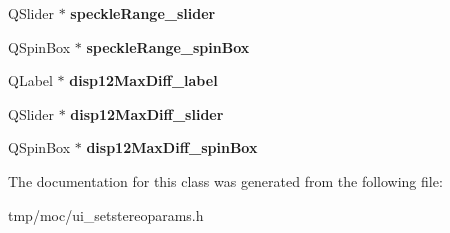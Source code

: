 \begin{DoxyCompactItemize}
\item 
Q\+Slider $\ast$ {\bfseries speckle\+Range\+\_\+slider}\hypertarget{class_ui___set_stereo_params_a61638a0d0a65f4e4a39b958e9452ee7d}{}\label{class_ui___set_stereo_params_a61638a0d0a65f4e4a39b958e9452ee7d}

\item 
Q\+Spin\+Box $\ast$ {\bfseries speckle\+Range\+\_\+spin\+Box}\hypertarget{class_ui___set_stereo_params_a7c4da87db1e119212bf3fd90b88d02f8}{}\label{class_ui___set_stereo_params_a7c4da87db1e119212bf3fd90b88d02f8}

\item 
Q\+Label $\ast$ {\bfseries disp12\+Max\+Diff\+\_\+label}\hypertarget{class_ui___set_stereo_params_a1fa58eb96e57c066cb98f1471d94bce2}{}\label{class_ui___set_stereo_params_a1fa58eb96e57c066cb98f1471d94bce2}

\item 
Q\+Slider $\ast$ {\bfseries disp12\+Max\+Diff\+\_\+slider}\hypertarget{class_ui___set_stereo_params_a6b7336ca20cecafe5c020efefe074a14}{}\label{class_ui___set_stereo_params_a6b7336ca20cecafe5c020efefe074a14}

\item 
Q\+Spin\+Box $\ast$ {\bfseries disp12\+Max\+Diff\+\_\+spin\+Box}\hypertarget{class_ui___set_stereo_params_a312f83936aab13a3d6fee7157f571cf8}{}\label{class_ui___set_stereo_params_a312f83936aab13a3d6fee7157f571cf8}

\end{DoxyCompactItemize}


The documentation for this class was generated from the following file\+:\begin{DoxyCompactItemize}
\item 
tmp/moc/ui\+\_\+setstereoparams.\+h\end{DoxyCompactItemize}
